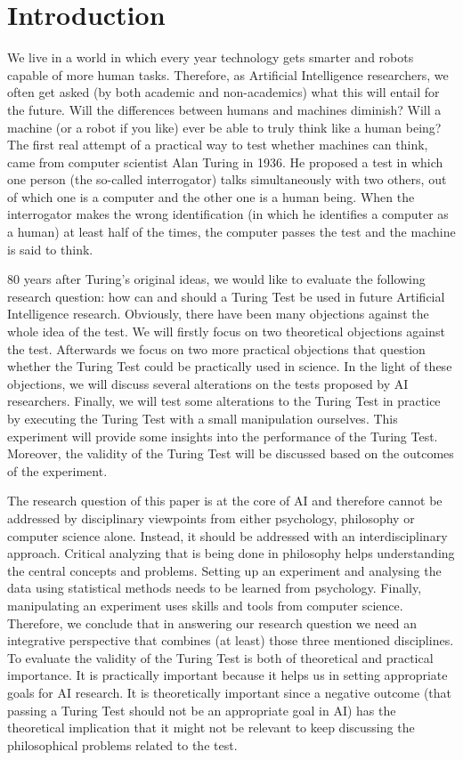 \section{Introduction}
We live in a world in which every year technology gets smarter and robots capable of more human tasks. Therefore, as Artificial Intelligence researchers, we often get asked (by both academic and non-academics) what this will entail for the future. Will the differences between humans and machines diminish? Will a machine (or a robot if you like) ever be able to truly think like a human being? The first real attempt of a practical way to test whether machines can think, came from computer scientist Alan Turing in 1936. He proposed a test in which one person (the so-called interrogator) talks simultaneously with two others, out of which one is a computer and the other one is a human being. When the interrogator makes the wrong identification (in which he identifies a computer as a human) at least half of the times, the computer passes the test and the machine is said to think.

80 years after Turing's original ideas, we would like to evaluate the following research question: how can and should a Turing Test be used in future Artificial Intelligence research. Obviously, there have been many objections against the whole idea of the test. We will firstly focus on two theoretical objections against the test. Afterwards we focus on two more practical objections that question whether the Turing Test could be practically used in science. In the light of these objections, we will discuss several alterations on the tests proposed by AI researchers. Finally, we will test some alterations to the Turing Test in practice by executing the Turing Test with a small manipulation ourselves. This experiment will provide some insights into the performance of the Turing Test. Moreover, the validity of the Turing Test will be discussed based on the outcomes of the experiment.

The research question of this paper is at the core of AI and therefore cannot be addressed by disciplinary viewpoints from either psychology, philosophy or computer science alone. Instead, it should be addressed with an interdisciplinary approach. Critical analyzing that is being done in philosophy helps understanding the central concepts and problems. Setting up an experiment and analysing the data using statistical methods needs to be learned from psychology. Finally, manipulating an experiment uses skills and tools from computer science. Therefore, we conclude that in answering our research question we need an integrative perspective that combines (at least) those three mentioned disciplines. To evaluate the validity of the Turing Test is both of theoretical and practical importance. It is practically important because it helps us in setting appropriate goals for AI research. It is theoretically important since a negative outcome (that passing a Turing Test should not be an appropriate goal in AI) has the theoretical implication that it might not be relevant to keep discussing the philosophical problems related to the test.
